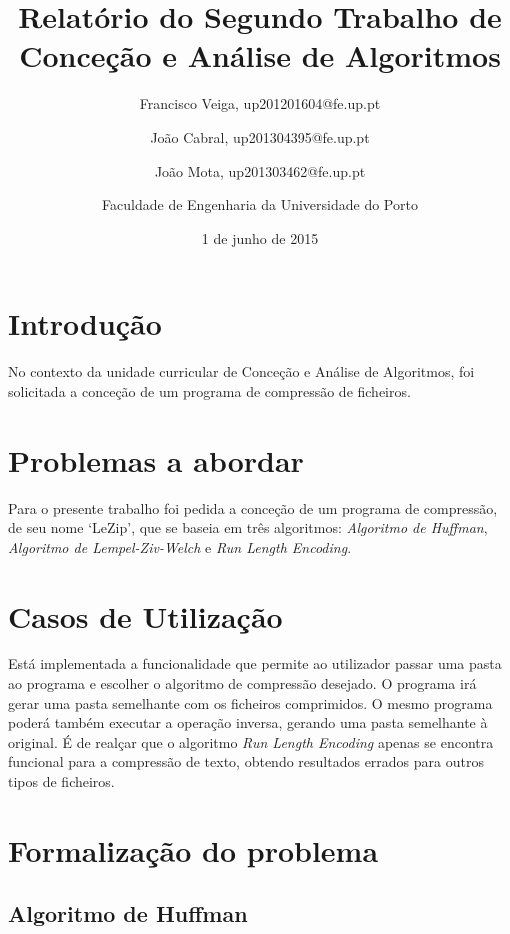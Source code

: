 \documentclass[a4paper,12pt,titlepage]{article}
\begin{document}
\title{Relatório do Segundo Trabalho de Conceção e Análise de Algoritmos}
\date{1 de junho de 2015}
\author{Francisco Veiga, up201201604@fe.up.pt
 \and João Cabral, up201304395@fe.up.pt
 \and  João Mota, up201303462@fe.up.pt\linebreak
 \and Faculdade de Engenharia da Universidade do Porto}
%
\maketitle
\tableofcontents
\newpage
\listoffigures
\listoftables
\newpage
\section{Introdução}

No contexto da unidade curricular de Conceção e Análise de Algoritmos, foi solicitada a conceção de um programa de compressão de ficheiros.

\section{Problemas a abordar} 
Para o presente trabalho foi pedida a conceção de um programa de compressão, de seu nome `LeZip', que se baseia em três algoritmos: \emph{Algoritmo de Huffman}, \emph{Algoritmo de Lempel-Ziv-Welch} e \emph{Run Length Encoding}.


\section{Casos de Utilização}
Está implementada a funcionalidade que permite ao utilizador passar uma pasta ao programa e escolher o algoritmo de compressão desejado. O programa irá gerar uma pasta semelhante com os ficheiros comprimidos. O mesmo programa poderá também executar a operação inversa, gerando uma pasta semelhante à original.
\newline
É de realçar que o algoritmo \emph{Run Length Encoding} apenas se encontra funcional para a compressão de texto, obtendo resultados errados para outros tipos de ficheiros.

\newpage
\section{Formalização do problema}

\subsection{Algoritmo de Huffman}
\end{document}

